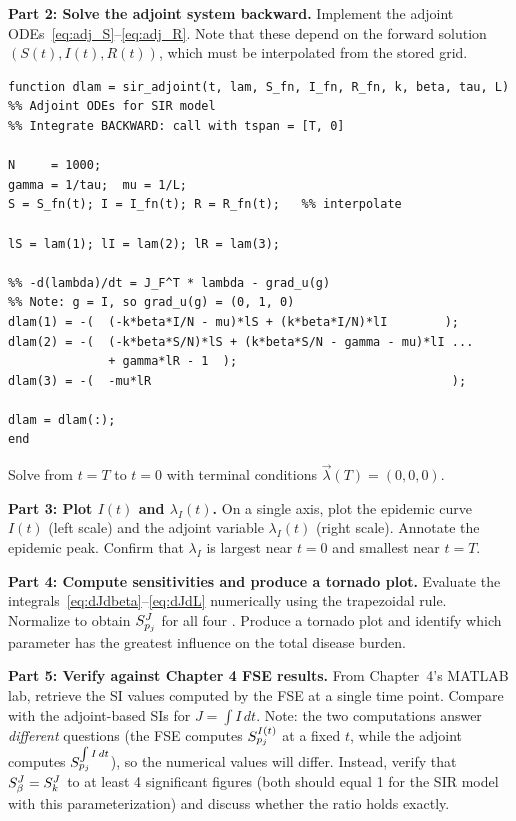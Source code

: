 \textbf{Part 2: Solve the adjoint system backward.}
Implement the adjoint ODEs~\eqref{eq:adj_S}--\eqref{eq:adj_R}.
Note that these depend on the forward solution $(S(t), I(t), R(t))$,
which must be interpolated from the stored grid.

\begin{verbatim}
function dlam = sir_adjoint(t, lam, S_fn, I_fn, R_fn, k, beta, tau, L)
%% Adjoint ODEs for SIR model
%% Integrate BACKWARD: call with tspan = [T, 0]

N     = 1000;
gamma = 1/tau;  mu = 1/L;
S = S_fn(t); I = I_fn(t); R = R_fn(t);   %% interpolate

lS = lam(1); lI = lam(2); lR = lam(3);

%% -d(lambda)/dt = J_F^T * lambda - grad_u(g)
%% Note: g = I, so grad_u(g) = (0, 1, 0)
dlam(1) = -(  (-k*beta*I/N - mu)*lS + (k*beta*I/N)*lI        );
dlam(2) = -(  (-k*beta*S/N)*lS + (k*beta*S/N - gamma - mu)*lI ...
              + gamma*lR - 1  );
dlam(3) = -(  -mu*lR                                          );

dlam = dlam(:);
end
\end{verbatim}

Solve from $t = T$ to $t = 0$ with terminal conditions
$\vec{\lambda}(T) = (0,0,0)$.

\textbf{Part 3: Plot $I(t)$ and $\lambda_I(t)$.}
On a single axis, plot the epidemic curve $I(t)$ (left scale)
and the adjoint variable $\lambda_I(t)$ (right scale).
Annotate the epidemic peak. Confirm that $\lambda_I$ is largest
near $t=0$ and smallest near $t=T$.

\textbf{Part 4: Compute sensitivities and produce a tornado plot.}
Evaluate the integrals~\eqref{eq:dJdbeta}--\eqref{eq:dJdL}
numerically using the trapezoidal rule. Normalize to obtain
$S_{p_j}^{J}$ for all four \POIs. Produce a tornado plot
and identify which parameter has the greatest influence on the
total disease burden.

\textbf{Part 5: Verify against Chapter 4 FSE results.}
From Chapter~4's MATLAB lab, retrieve the SI values computed by
the FSE at a single time point. Compare with the adjoint-based
SIs for $J = \int I\,dt$. Note: the two computations answer
\emph{different} questions (the FSE computes $S_{p_j}^{I(t)}$
at a fixed $t$, while the adjoint computes $S_{p_j}^{\int I\,dt}$),
so the numerical values will differ.
Instead, verify that $S_{\beta}^{J} = S_{k}^{J}$ to at least 4
significant figures (both should equal 1 for the SIR model with
this parameterization) and discuss whether the ratio holds exactly.

